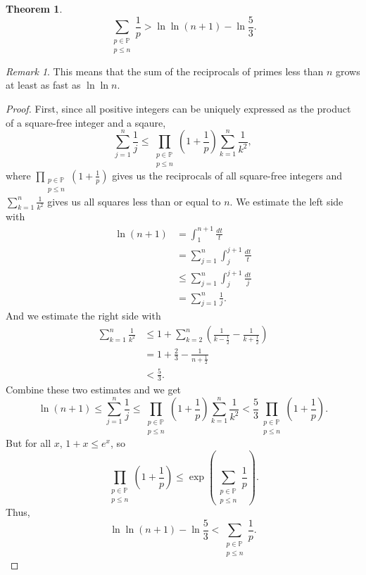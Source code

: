 \documentclass[a4paper]{article}
\newtheorem{theorem}{Theorem}[section]
\theoremstyle{definition}
\theoremstyle{remark}
\newtheorem*{remark}{Remark}
\begin{document}
\begin{theorem}
  \[
  \sum_{\substack{p\in\mathbb{P}\\p\le n}}\frac{1}{p}>\ln\ln(n+1)-\ln\frac{5}{3}
  .
  \]
  \label{thm:sumReciprocalPrimeLnLn}
\end{theorem}
\begin{remark}
  This means that the sum of the reciprocals of primes less than $n$ grows at least as fast as $\ln\ln n$.
  \label{rem:sumReciprocalPrimeLnLn}
\end{remark}
\begin{proof}
  First, since all positive integers can be uniquely expressed as the product of a square-free integer and a sqaure,
  \[
  \sum_{j=1}^n\frac{1}{j}\le\prod_{\substack{p\in\mathbb{P}\\p\le n}}\left( 1+\frac{1}{p} \right)\sum_{k=1}^n\frac{1}{k^2}
  ,
  \]
  where $\displaystyle\prod_{\substack{p\in\mathbb{P}\\p\le n}}\left( 1+\frac{1}{p} \right)$ gives us the reciprocals of all square-free integers and $\displaystyle\sum_{k=1}^n\frac{1}{k^2}$ gives us all squares less than or equal to $n$.
  We estimate the left side with
  \begin{align*}
    \ln(n+1)&=\int_1^{n+1}\frac{dt}{t}\\
    &=\sum_{j=1}^n\int_j^{j+1}\frac{dt}{t}\\
    &\le\sum_{j=1}^n\int_j^{j+1}\frac{dt}{j}\\
    &=\sum_{j=1}^n\frac{1}{j}
    .
  \end{align*}
  And we estimate the right side with
  \begin{align*}
    \sum_{k=1}^n\frac{1}{k^2}&\le1+\sum_{k=2}^n\left( \frac{1}{k-\frac{1}{2}}-\frac{1}{k+\frac{1}{2}} \right)\\
    &=1+\frac{2}{3}-\frac{1}{n+\frac{1}{2}}\\
    &<\frac{5}{3}
    .
  \end{align*}
  Combine these two estimates and we get
  \[
  \ln(n+1)\le\sum_{j=1}^n\frac{1}{j}\le\prod_{\substack{p\in\mathbb{P}\\p\le n}}\left( 1+\frac{1}{p} \right)\sum_{k=1}^n\frac{1}{k^2}<\frac{5}{3}\prod_{\substack{p\in\mathbb{P}\\p\le n}}\left( 1+\frac{1}{p} \right)
  .
  \]
  But for all $x$, $1+x\le e^{x}$, so
  \[
  \prod_{\substack{p\in\mathbb{P}\\p\le n}}\left( 1+\frac{1}{p} \right)\le \exp\left( \sum_{\substack{p\in\mathbb{P}\\p\le n}}\frac{1}{p} \right)
  .
  \]
  Thus, 
  \[
  \ln\ln(n+1)-\ln\frac{5}{3}<\sum_{\substack{p\in\mathbb{P}\\p\le n}}\frac{1}{p}
  .
  \]
\end{proof}
\end{document}
